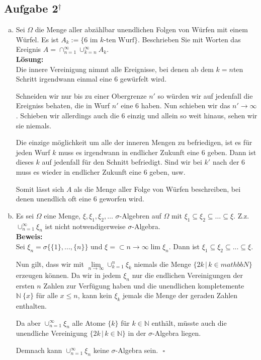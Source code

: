 \documentclass[11pt,a4paper,ngerman]{article}
\newcommand{\set}[1]{ \{ #1 \}}
\begin{document}
\subsection*{Aufgabe 2$^\dagger$}
\begin{enumerate}[a)]
\item Sei $\Omega$ die Menge aller abzählbar unendlichen Folgen von Würfen mit einem Würfel. Es ist $A_k := \set{\text{6 im $k$-ten Wurf}}$. Beschrieben
Sie mit Worten das Ereignis $A = \cap_{n=1}^\infty \cup_{k=n}^\infty A_k$.\\

\textbf{Lösung:}\\

Die innere Vereinigung nimmt alle Ereignisse, bei denen ab dem $k=n$ten
Schritt irgendwann einmal eine $6$ gewürfelt wird.

Schneiden wir nur bis zu einer Obergrenze $n'$ so würden wir auf jedenfall
die Ereigniss behaten, die in Wurf $n'$ eine $6$ haben. Nun schieben
wir das $n' \rightarrow \infty$. Schieben wir allerdings auch die $6$ einzig und
allein so weit hinaus, sehen wir sie niemals.

Die einzige möglichkeit um alle der inneren Mengen zu befriedigen, ist
es für jeden Wurf $k$ muss es irgendwann in endlicher Zukunft eine $6$ geben.
Dann ist dieses $k$ auf jedenfall für den Schnitt befriedigt. Sind wir bei $k'$ nach der $6$ muss es wieder in endlicher Zukunft eine $6$ geben, usw.

Somit lässt sich $A$ als die Menge aller Folge von Würfen beschreiben, bei denen
unendlich oft eine $6$ geworfen wird.

\item Es sei $\Omega$ eine Menge, $\xi, \xi_1, \xi_2,\ldots$ $\sigma$-Algebren auf $\Omega$ mit $\xi_1 \subseteq \xi_2 \subseteq \ldots \subseteq \xi$.
Z.z. $\cup_{n=1}^\infty \xi_n$ ist nicht notwendigerweise $\sigma$-Algebra.\\

\textbf{Beweis:}\\

Sei $\xi_n = \sigma \{ \{1\} , ... , \{n\}\}$ und $\xi = \subset{n\rightarrow \infty}{\lim} \xi_n$.
Dann ist $\xi_1 \subseteq \xi_2 \subseteq ... \subseteq \xi$.

Nun gilt, dass wir mit $\underset{n\rightarrow\infty}{\lim}\cup_{k=1}^n \xi_k$
niemals die Menge $\{2k \, | \, k \in mathbb{N}\}$ erzeugen können.
Da wir in jedem $\xi_n$ nur die endlichen Vereinigungen der ersten $n$ Zahlen
zur Verfügung haben und die unendlichen kompletemente $\mathbb{N} \ \{x\}$ für alle $x \leq n$, kann kein $\xi_k$ jemals die Menge der geraden Zahlen enthalten.

Da aber $\cup_{n=1}^\infty \xi_n$ alle Atome $\{k\}$ für $k\in \mathbb{N}$ 
enthält, müsste auch die unendliche Vereinigung $\{2k \, | \, k \in \mathbb{N}\}$ in der $\sigma$-Algebra liegen.

Demnach kann $\cup_{n=1}^\infty \xi_n$ keine $\sigma$-Algebra sein.
 $\mbox{}$ \hfill $\square$

\end{enumerate}
\end{document}
